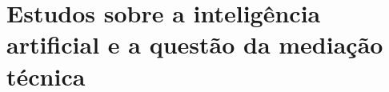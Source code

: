 \section{Estudos sobre a inteligência artificial e a questão da mediação técnica}
\label{sec:etnografias_ia_mediacao}


